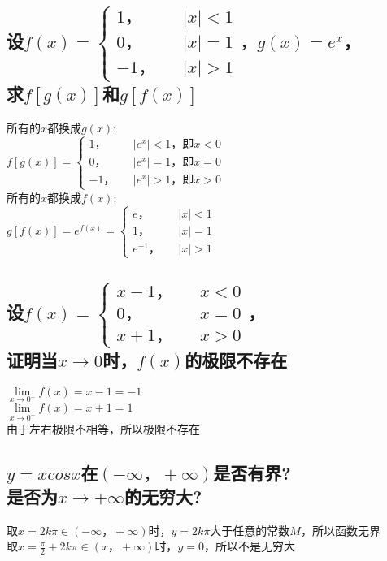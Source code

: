 \documentclass{article}
\begin{document}
\begin{flushleft}
	\subsection{
	设$f(x)=\left\{
	\begin{array}{rcl}
	1，& & |x|<1\\
	0，& & |x|=1\\
	-1，& & |x|>1
	\end{array} \right.，g(x)=e^x$，\\
	求$f[g(x)]$和$g[f(x)]$
	}
	所有的$x$都换成$g(x)$:\\
	$f[g(x)]=\left\{
	\begin{array}{rcl}
	1，& & |e^x|<1，\mbox{即}x<0\\
	0，& & |e^x|=1，\mbox{即}x=0\\
	-1，& & |e^x|>1，\mbox{即}x>0
	\end{array} \right.$\\
	所有的$x$都换成$f(x)$:\\
	$g[f(x)]=e^{f(x)}=\left\{
	\begin{array}{rcl}
	e，& & |x|<1\\
	1，& & |x|=1\\
	e^{-1}，& & |x|>1
	\end{array} \right.$\\
	
	\subsection{
	设$f(x)=\left\{
	\begin{array}{rcl}
	x-1，& & x<0\\
	0，& & x=0\\
	x+1，& & x>0
	\end{array} \right.$，\\
	证明当$x\to 0$时，$f(x)$的极限不存在
	}
	$\lim\limits_{x\to 0^-}f(x)=x-1=-1$\\
	$\lim\limits_{x\to 0^+}f(x)=x+1=1$\\
	由于左右极限不相等，所以极限不存在\\
	
	\subsection{
	$y=xcosx$在$(-\infty，+\infty)$是否有界?\\
	是否为$x\to +\infty$的无穷大?
	}
	取$x=2k\pi\in(-\infty，+\infty)$时，$y=2k\pi$大于任意的常数$M$，所以函数无界\\
	取$x=\frac{\pi}{2}+2k\pi\in(x，+\infty)$时，$y=0$，所以不是无穷大\\
	
\end{flushleft}
\end{document}

